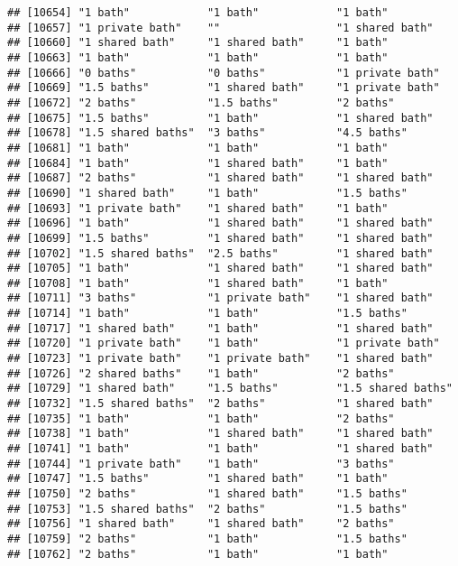 \documentclass[
]{article}
\begin{document}
\begin{verbatim}
## [10654] "1 bath"            "1 bath"            "1 bath"           
## [10657] "1 private bath"    ""                  "1 shared bath"    
## [10660] "1 shared bath"     "1 shared bath"     "1 bath"           
## [10663] "1 bath"            "1 bath"            "1 bath"           
## [10666] "0 baths"           "0 baths"           "1 private bath"   
## [10669] "1.5 baths"         "1 shared bath"     "1 private bath"   
## [10672] "2 baths"           "1.5 baths"         "2 baths"          
## [10675] "1.5 baths"         "1 bath"            "1 shared bath"    
## [10678] "1.5 shared baths"  "3 baths"           "4.5 baths"        
## [10681] "1 bath"            "1 bath"            "1 bath"           
## [10684] "1 bath"            "1 shared bath"     "1 bath"           
## [10687] "2 baths"           "1 shared bath"     "1 shared bath"    
## [10690] "1 shared bath"     "1 bath"            "1.5 baths"        
## [10693] "1 private bath"    "1 shared bath"     "1 bath"           
## [10696] "1 bath"            "1 shared bath"     "1 shared bath"    
## [10699] "1.5 baths"         "1 shared bath"     "1 shared bath"    
## [10702] "1.5 shared baths"  "2.5 baths"         "1 shared bath"    
## [10705] "1 bath"            "1 shared bath"     "1 shared bath"    
## [10708] "1 bath"            "1 shared bath"     "1 bath"           
## [10711] "3 baths"           "1 private bath"    "1 shared bath"    
## [10714] "1 bath"            "1 bath"            "1.5 baths"        
## [10717] "1 shared bath"     "1 bath"            "1 shared bath"    
## [10720] "1 private bath"    "1 bath"            "1 private bath"   
## [10723] "1 private bath"    "1 private bath"    "1 shared bath"    
## [10726] "2 shared baths"    "1 bath"            "2 baths"          
## [10729] "1 shared bath"     "1.5 baths"         "1.5 shared baths" 
## [10732] "1.5 shared baths"  "2 baths"           "1 shared bath"    
## [10735] "1 bath"            "1 bath"            "2 baths"          
## [10738] "1 bath"            "1 shared bath"     "1 shared bath"    
## [10741] "1 bath"            "1 bath"            "1 shared bath"    
## [10744] "1 private bath"    "1 bath"            "3 baths"          
## [10747] "1.5 baths"         "1 shared bath"     "1 bath"           
## [10750] "2 baths"           "1 shared bath"     "1.5 baths"        
## [10753] "1.5 shared baths"  "2 baths"           "1.5 baths"        
## [10756] "1 shared bath"     "1 shared bath"     "2 baths"          
## [10759] "2 baths"           "1 bath"            "1.5 baths"        
## [10762] "2 baths"           "1 bath"            "1 bath"           

\end{verbatim}
\end{document}
